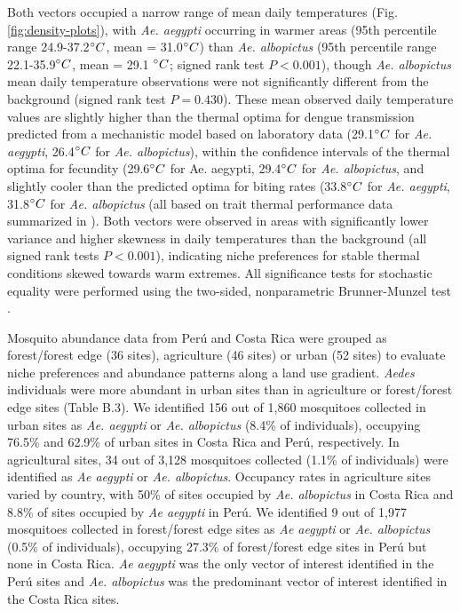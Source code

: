 Both vectors occupied a narrow range of mean daily temperatures (Fig. \ref{fig:density-plots}), with \textit{Ae. aegypti} occurring in warmer areas (95th percentile range 24.9-37.2$\degree C$, mean = 31.0$\degree C$) than \textit{Ae. albopictus} (95th percentile range 22.1-35.9$\degree C$, mean = 29.1 $\degree C$; signed rank test $P < 0.001$), though \textit{Ae. albopictus} mean daily temperature observations were not significantly different from the background (signed rank test $P = 0.430$). These mean observed daily temperature values are slightly higher than the thermal optima for dengue transmission predicted from a mechanistic model based on laboratory data (29.1$\degree C$ for \textit{Ae. aegypti}, 26.4$\degree C$ for \textit{Ae. albopictus}), within the confidence intervals of the thermal optima for fecundity (29.6$\degree C$ for Ae. aegypti, 29.4$\degree C$ for \textit{Ae. albopictus}, and slightly cooler than the predicted optima for biting rates (33.8$\degree C$ for \textit{Ae. aegypti}, 31.8$\degree C$ for \textit{Ae. albopictus} (all based on trait thermal performance data summarized in \cite{Mordecai2017-tb}). Both vectors were observed in areas with significantly lower variance and higher skewness in daily temperatures than the background (all signed rank tests $P < 0.001$), indicating niche preferences for stable thermal conditions skewed towards warm extremes. All significance tests for stochastic equality were performed using the two-sided, nonparametric Brunner-Munzel test \cite{Brunner2000-hd}.

Mosquito abundance data from Perú and Costa Rica were grouped as forest/forest edge (36 sites), agriculture (46 sites) or urban (52 sites) to evaluate niche preferences and abundance patterns along a land use gradient. \textit{Aedes} individuals were more abundant in urban sites than in agriculture or forest/forest edge sites (Table B.3). We identified 156 out of 1,860 mosquitoes collected in urban sites as \textit{Ae. aegypti} or \textit{Ae. albopictus} (8.4\% of individuals), occupying 76.5\% and 62.9\% of urban sites in Costa Rica and Perú, respectively. In agricultural sites, 34 out of 3,128 mosquitoes collected (1.1\% of individuals) were identified as \textit{Ae aegypti} or \textit{Ae. albopictus}. Occupancy rates in agriculture sites varied by country, with 50\% of sites occupied by \textit{Ae. albopictus} in Costa Rica and 8.8\% of sites occupied by \textit{Ae aegypti} in Perú. We identified 9 out of 1,977 mosquitoes collected in forest/forest edge sites as \textit{Ae aegypti} or \textit{Ae. albopictus} (0.5\% of individuals), occupying 27.3\% of forest/forest edge sites in Perú but none in Costa Rica. \textit{Ae aegypti} was the only vector of interest identified in the Perú sites and \textit{Ae. albopictus} was the predominant vector of interest identified in the Costa Rica sites.

